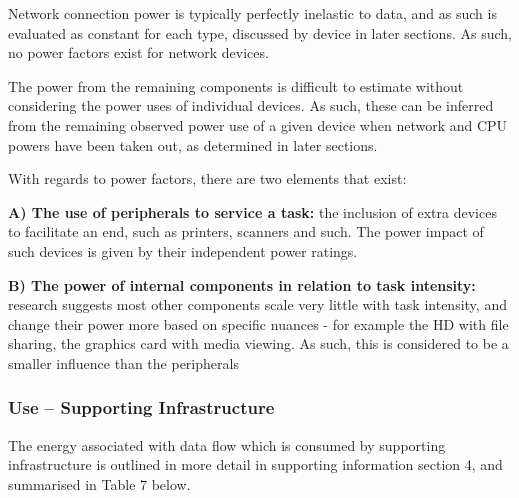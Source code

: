 \documentclass[conference]{IEEEtran}
\begin{document}

Network connection power is typically perfectly inelastic to data, and
as such is evaluated as constant for each type, discussed by device in
later sections. As such, no power factors exist for network devices.


The power from the remaining components is difficult to estimate
without considering the power uses of individual devices. As such,
these can be inferred from the remaining observed power use of a given
device when network and CPU powers have been taken out, as determined
in later sections.

With regards to power factors, there are two elements that exist:

{\textbf{A) The use of peripherals to service a task:}} the inclusion of extra
devices to facilitate an end, such as printers, scanners and such. The
power impact of such devices is given by their independent power
ratings.

{\textbf{B) The power of internal components in relation to task
    intensity:}} research suggests most other components scale very little with task
intensity, and change their power more based on specific nuances - for
example the HD with file sharing, the graphics card with media
viewing. As such, this is considered to be a smaller influence than
the peripherals



\subsubsection{Use -- Supporting Infrastructure}

The energy associated with data flow which is consumed by supporting
infrastructure is outlined in more detail in supporting information
section 4, and summarised in Table 7 below.
\end{document}
